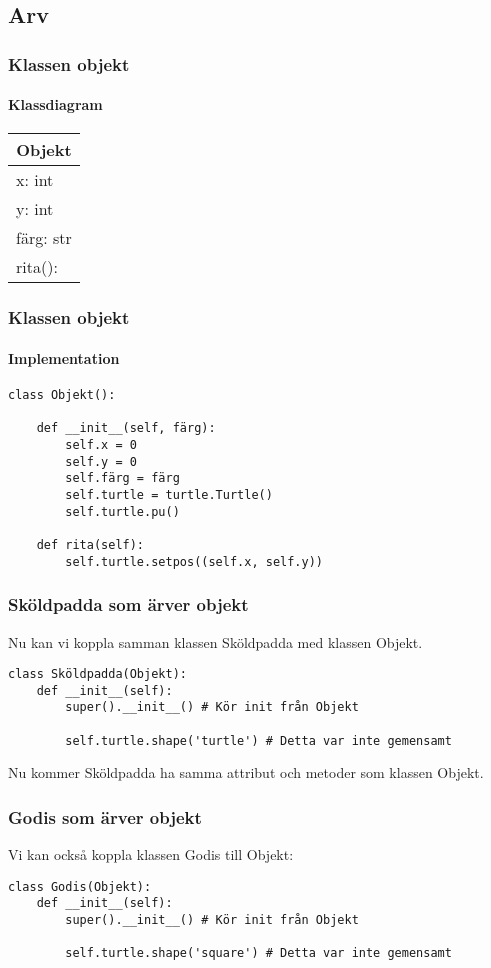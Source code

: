\documentclass[aspectratio=169]{beamer}
\begin{document}
\subsection{Arv}

\begin{frame}
	\frametitle{Klassen objekt}
	\framesubtitle{Klassdiagram}
	
	\centering
	\begin{tabular}{|l|}
		\hline
		\multicolumn{1}{|c|}{Objekt} \\ \hline
		x: int \\
		y: int \\ 
		färg: str \\\hline
		rita():\\ \hline
	\end{tabular}
	
\end{frame}

\begin{frame}[fragile]
	\frametitle{Klassen objekt}
	\framesubtitle{Implementation}
	
	\begin{lstlisting}
class Objekt():

    def __init__(self, färg):
        self.x = 0
        self.y = 0
        self.färg = färg
        self.turtle = turtle.Turtle()
        self.turtle.pu()
        
    def rita(self):
        self.turtle.setpos((self.x, self.y))
	\end{lstlisting}
	
\end{frame}

\begin{frame}[fragile]
	\frametitle{Sköldpadda som ärver objekt}
	
	Nu kan vi koppla samman klassen Sköldpadda med klassen Objekt.
	
	\begin{lstlisting}
class Sköldpadda(Objekt):
    def __init__(self):
        super().__init__() # Kör init från Objekt
        
        self.turtle.shape('turtle') # Detta var inte gemensamt
	\end{lstlisting}
	
	Nu kommer Sköldpadda ha samma attribut och metoder som klassen Objekt.
	
\end{frame}

\begin{frame}[fragile]
	\frametitle{Godis som ärver objekt}
	
	Vi kan också koppla klassen Godis till Objekt:
	
	\begin{lstlisting}
class Godis(Objekt):
    def __init__(self):
        super().__init__() # Kör init från Objekt
        
        self.turtle.shape('square') # Detta var inte gemensamt
	\end{lstlisting}

\end{frame}
\end{document}
